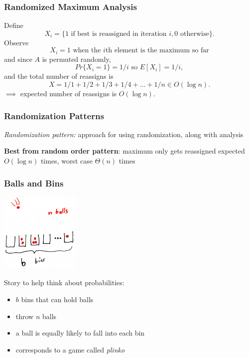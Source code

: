 \documentclass[10pt]{beamer}
\begin{document}
\begin{frame} \frametitle{Randomized Maximum Analysis}
Define
\[ X_i = \{\text{1 if best is reassigned in iteration } i, 0 \text{ otherwise} \} .\]
Observe
\[ X_i = 1 \text{ when the } i\text{th element is the maximum so far} \]
and since $A$ is permuted randomly,
\[ Pr\{X_i=1\} = 1/i \text{ so } E[X_i] = 1/i, \]
and the total number of reassigns is
\[ X = 1/1 + 1/2 + 1/3 + 1/4 + \ldots + 1/n \in O(\log n). \]
$\implies$ expected number of reassigns is $O(\log n).$
\end{frame}


\begin{frame} \frametitle{Randomization Patterns}
\emph{Randomization pattern:} approach for using randomization, along with
analysis
\vspace{1cm}

\textbf{Best from random order pattern}: maximum only gets reassigned expected $O(\log n)$ times,
worst case $\Theta(n)$ times

\end{frame}

\begin{frame} \frametitle{Balls and Bins}
  \begin{center}
    \includegraphics[height=1.5in]{balls-bins.jpg}
  \end{center}  

Story to help think about probabilities:
\begin{itemize}
  \item $b$ bins that can hold balls
  \item throw $n$ balls
  \item a ball is equally likely to fall into each bin
  \item corresponds to a game called \emph{plinko}
\end{itemize}
\end{frame}
\end{document}
